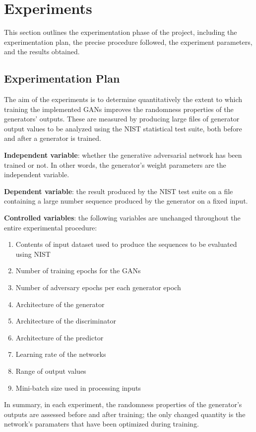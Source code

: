 \documentclass[12pt, titlepage]{report}
\theoremstyle{definition}
\begin{document}
\chapter{Experiments}\label{chapter:experiments}
This section outlines the experimentation phase of the project, including the experimentation plan, the precise procedure followed, the experiment parameters, and the results obtained.


\section{Experimentation Plan}
The aim of the experiments is to determine quantitatively the extent to which training the implemented GANs improves the randomness properties of the generators' outputs. These are measured by producing large files of generator output values to be analyzed using the NIST statistical test suite, both before and after a generator is trained.

\textbf{Independent variable}: whether the generative adversarial network has been trained or not. In other words, the generator's weight parameters are the independent variable.

\textbf{Dependent variable}: the result produced by the NIST test suite on a file containing a large number sequence produced by the generator on a fixed input.

\textbf{Controlled variables}: the following variables are unchanged throughout the entire experimental procedure:
\begin{enumerate}
    \itemsep0em
    \item Contents of input dataset used to produce the sequences to be evaluated using NIST
    \item Number of training epochs for the GANs
    \item Number of adversary epochs per each generator epoch
    \item Architecture of the generator
    \item Architecture of the discriminator
    \item Architecture of the predictor
    \item Learning rate of the networks
    \item Range of output values
    \item Mini-batch size used in processing inputs
\end{enumerate}

In summary, in each experiment, the randomness properties of the generator's outputs are assessed before and after training; the only changed quantity is the network's paramaters that have been optimized during training.
\end{document}
